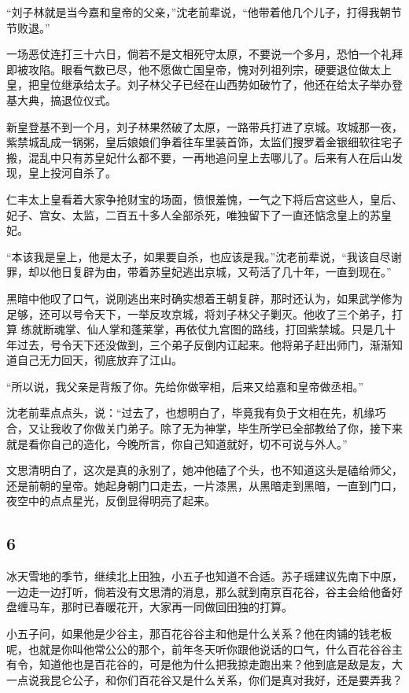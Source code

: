 “刘子林就是当今嘉和皇帝的父亲，”沈老前辈说，“他带着他几个儿子，打得我朝节节败退。”

一场恶仗连打三十六日，倘若不是文相死守太原，不要说一个多月，恐怕一个礼拜即被攻陷。眼看气数已尽，他不愿做亡国皇帝，愧对列祖列宗，硬要退位做太上皇，把皇位继承给太子。刘子林父子已经在山西势如破竹了，他还在给太子举办登基大典，搞退位仪式。

新皇登基不到一个月，刘子林果然破了太原，一路带兵打进了京城。攻城那一夜，紫禁城乱成一锅粥，皇后娘娘们争着往车里装首饰，太监们搜罗着金银细软往宅子搬，混乱中只有苏皇妃什么都不要，一再地追问皇上去哪儿了。后来有人在后山发现，皇上投河自杀了。

仁丰太上皇看着大家争抢财宝的场面，愤恨羞愧，一气之下将后宫这些人，皇后、妃子、宫女、太监，二百五十多人全部杀死，唯独留下了一直还惦念皇上的苏皇妃。

“本该我是皇上，他是太子，如果要自杀，也应该是我。”沈老前辈说，“我该自尽谢罪，却以他日复辟为由，带着苏皇妃逃出京城，又苟活了几十年，一直到现在。”

黑暗中他叹了口气，说刚逃出来时确实想着王朝复辟，那时还认为，如果武学修为足够，还可以号令天下，一举反攻京城，将刘子林父子剿灭。他收了三个弟子，打算
练就断魂掌、仙人掌和蓬莱掌，再依仗九宫图的路线，打回紫禁城。只是几十年过去，号令天下还没做到，三个弟子反倒内讧起来。他将弟子赶出师门，渐渐知道自己无力回天，彻底放弃了江山。

“所以说，我父亲是背叛了你。先给你做宰相，后来又给嘉和皇帝做丞相。”

沈老前辈点点头，说：“过去了，也想明白了，毕竟我有负于文相在先，机缘巧合，又让我收了你做关门弟子。除了无为神掌，毕生所学已全部教给了你，接下来就是看你自己的造化，今晚所言，你自己知道就好，切不可说与外人。”

文思清明白了，这次是真的永别了，她冲他磕了个头，也不知道这头是磕给师父，还是前朝的皇帝。她起身朝门口走去，一片漆黑，从黑暗走到黑暗，一直到门口，夜空中的点点星光，反倒显得明亮了起来。
\newline

{\centering\subsection{6}}

冰天雪地的季节，继续北上田独，小五子也知道不合适。苏子瑶建议先南下中原，一边走一边打听，倘若没有文思清的消息，那么就到南京百花谷，谷主会给他备好盘缠马车，那时已春暖花开，大家再一同做回田独的打算。

小五子问，如果他是少谷主，那百花谷谷主和他是什么关系？他在肉铺的钱老板呢，也就是你叫他常公公的那个，前年冬天听你跟他说话的口气，什么百花谷谷主有令，知道他也是百花谷的，可是他为什么把我掠走跑出来？他到底是敌是友，大一点说我昆仑公子，和你们百花谷又是什么关系，你们是真对我好，还是要弄我？

